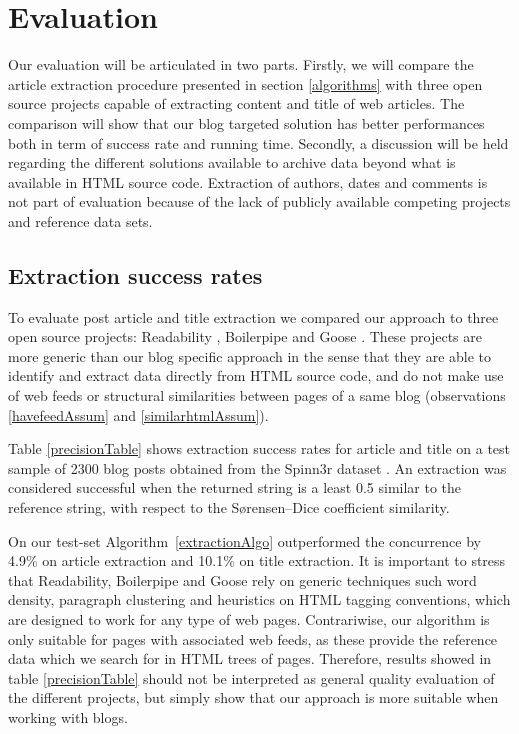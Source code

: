 \section{Evaluation}

Our evaluation will be articulated in two parts. Firstly, we will compare the article extraction procedure presented in section \ref{algorithms} with three open source projects capable of extracting content and title of web articles. The comparison will show that our blog targeted solution has better performances both in term of success rate and running time. Secondly, a discussion will be held regarding the different solutions available to archive data beyond what is available in HTML source code. Extraction of authors, dates and comments is not part of evaluation because of the lack of publicly available competing projects and reference data sets.



\subsection{Extraction success rates}
To evaluate post article and title extraction we compared our approach to three open source projects: Readability \cite{python-readability2011}, Boilerpipe \cite{kohlschuetter2010} and Goose \cite{goose2012}. These projects are more generic than our blog specific approach in the sense that they are able to identify and extract data directly from HTML source code, and do not make use of web feeds or structural similarities between pages of a same blog (observations \ref{havefeedAssum} and \ref{similarhtmlAssum}).

Table \ref{precisionTable} shows extraction success rates for article and title on a test sample of 2300 blog posts obtained from the Spinn3r dataset \cite{burton2011}. An extraction was considered successful when the returned string is a least 0.5 similar to the reference string, with respect to the Sørensen–Dice coefficient similarity. 

\precisionTable

On our test-set Algorithm~\ref{extractionAlgo} outperformed the concurrence by 4.9\% on article extraction and 10.1\% on title extraction. It is important to stress that Readability, Boilerpipe and Goose rely on generic techniques such word density, paragraph clustering and heuristics on HTML tagging conventions, which are designed to work for any type of web pages. Contrariwise, our algorithm is only suitable for pages with associated web feeds, as these provide the reference data which we search for in HTML trees of pages. Therefore, results showed in table \ref{precisionTable} should not be interpreted as general quality evaluation of the different projects, but simply show that our approach is more suitable when working with blogs.


